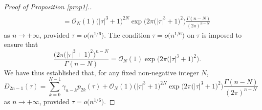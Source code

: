 \documentclass[pdftex]{sigma}
\numberwithin{equation}{section}
\begin{document}
\begin{proof}[Proof of Proposition \ref{prop1}.]
\begin{align*}
\\ &\qquad = \mathcal{O}_N (1)\bigl(\left| \tau \right|^3 + 1\bigr)^{2N} \exp \big( 2\pi \bigl(\left| \tau \right|^3 + 1\bigr)^2 \big)\frac{\Gamma(n - N)}{(2\pi )^{n - N} }
\end{align*}
as $n\to+\infty$, provided $\tau = o\big(n^{1/6}\big)$. The condition $\tau = o\big(n^{1/6}\big)$ on $\tau$ is imposed to ensure that
\[
\frac{\big(2\pi \bigl(\left| \tau \right|^3 + 1\bigr)^2 \big)^{n - N} }{\Gamma(n - N)} = \mathcal{O}_N (1) \exp \big( 2\pi \bigl(\left| \tau \right|^3 + 1\bigr)^2 \big).
\]
We have thus established that, for any fixed non-negative integer $N$,
\begin{equation}\label{eq5}
D_{2n - 1} (\tau ) = \sum_{k = 0}^{N - 1}\gamma _{n - k} p_{2k} (\tau ) + \mathcal{O}_N (1)\bigl(\left| \tau \right|^3 + 1\bigr)^{2N} \exp \big( 2\pi \bigl(\left| \tau \right|^3 + 1\bigr)^2 \big)\frac{\Gamma(n - N)}{(2\pi )^{n - N} }
\end{equation}
as $n\to+\infty$, provided $\tau = o\big(n^{1/6}\big)$.


\end{proof}
\end{document}
